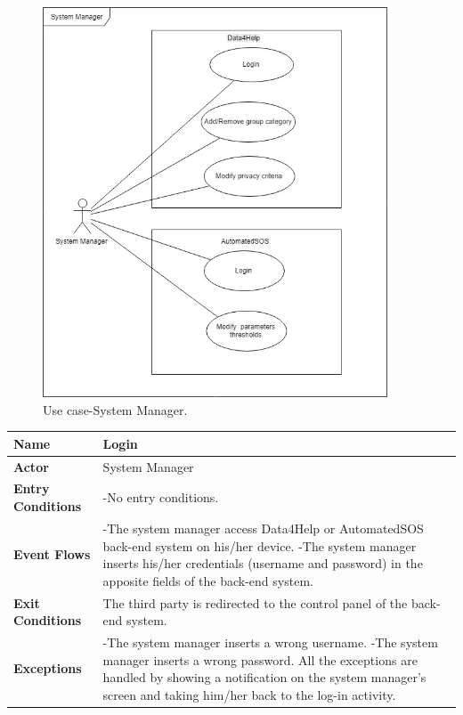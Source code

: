\begin{figure}[ht]
    \renewcommand{\thefigure}{\alph{figure}}
    \centering
    \captionsetup{labelformat=parens, labelsep=space, name=}
    \includegraphics[width = 290pt]{images/Use-case/UCSystemManager.jpg}
    \caption{Use case-System Manager.}
\end{figure}

\begin{center}
\begin{tabular}{|>{\bfseries} l |  p{8cm} |} \hline
    Name & {Login} \\ \hline
    Actor & {System Manager} \\ \hline
    Entry Conditions & {
    -No entry conditions.} \\ \hline
    Event Flows & {
    -The system manager access Data4Help or AutomatedSOS back-end system on his/her device.  \newline
    -The system manager inserts his/her credentials (username  and  password)  in  the  apposite  fields  of the back-end system.} \\ \hline
    Exit Conditions & {The third party is redirected to the control panel of the back-end system.} \\ \hline
    Exceptions & {
    -The system manager inserts a wrong username. \newline
    -The system manager inserts a wrong password. \newline
    All the exceptions are handled by showing a notification on the system manager's screen and taking him/her back to the log-in activity. } \\ \hline
\end{tabular}
\end{center}

